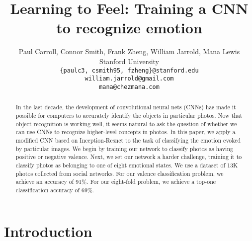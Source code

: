 \documentclass[10pt,twocolumn,letterpaper]{article}
\begin{document}
\title{Learning to Feel: Training a CNN to recognize emotion}

\author{Paul Carroll, Connor Smith, Frank Zheng, William Jarrold, Mana Lewis\footnotemark \\
Stanford University\\
{\tt\small \{paulc3, csmith95, fzheng\}@stanford.edu}\\
{\tt\small william.jarrold@gmail.com}\\
{\tt\small mana@chezmana.com}
}

\maketitle
{}

\begin{abstract}
In the last decade, the development of convolutional neural nets (CNNs) has made it possible for computers to accurately identify the objects in particular photos. Now that object recognition is working well, it seems natural to ask the question of whether we can use CNNs to recognize higher-level concepts in photos. In this paper, we apply a modified CNN based on Inception-Resnet to the task of classifying the emotion evoked by particular images. We begin by training our network to classify photos as having positive or negative valence. Next, we set our network a harder challenge, training it to classify photos as belonging to one of eight emotional states. We use a dataset of 13K photos collected from social networks. For our valence classification problem, we achieve an accuracy of 91\%. For our eight-fold problem, we achieve a top-one classification accuracy of 69\%.
\end{abstract}

\section{Introduction}




{\small


}
\end{document}
